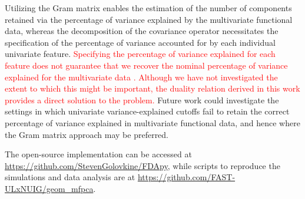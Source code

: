 Utilizing the Gram matrix enables the estimation of the number of components retained via the percentage of variance explained by the multivariate functional data, whereas the decomposition of the covariance operator necessitates the specification of the percentage of variance accounted for by each individual univariate feature. \textcolor{red}{Specifying the percentage of variance explained for each feature does not guarantee that we recover the nominal percentage of variance explained for the multivariate data \citep{golovkineEstimationNumberComponents2023}. Although we have not investigated the extent to which this might be important, the duality relation derived in this work provides a direct solution to the problem.} Future work could investigate the settings in which univariate variance-explained cutoffs fail to retain the correct percentage of variance explained in multivariate functional data, and hence where the Gram matrix approach may be preferred.

The open-source implementation can be accessed at \url{https://github.com/StevenGolovkine/FDApy}, while scripts to reproduce the simulations and data analysis are at \url{https://github.com/FAST-ULxNUIG/geom_mfpca}.


